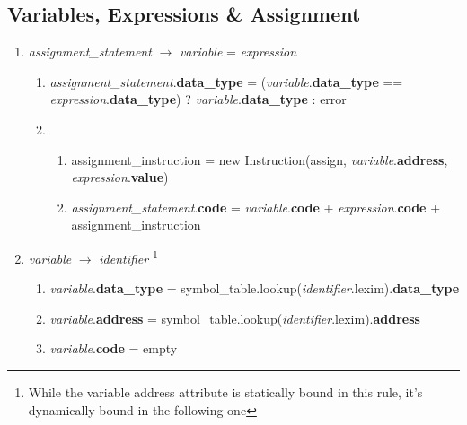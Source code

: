 \documentclass[12pt]{article}
\begin{document}
\subsection{Variables, Expressions \& Assignment}
\begin{enumerate}[label = \arabic*.]

\item \textit{ assignment\_statement } $\rightarrow$ \textit{ variable } = \textit{ expression} 
\begin{enumerate}[label = \roman*.]
\item \textit{assignment\_statement}.\textbf{data\_type} = (\textit{variable}.\textbf{data\_type} == \textit{expression}.\textbf{data\_type}) ? \textit{variable}.\textbf{data\_type} : error
\item
\begin{enumerate}[label = \alph*.]
\item assignment\_instruction = new Instruction(assign, \textit{variable}.\textbf{address}, \textit{expression}.\textbf{value})
\item \textit{assignment\_statement}.\textbf{code} = \textit{variable}.\textbf{code} + \textit{expression}.\textbf{code} + assignment\_instruction
\end{enumerate}
\end{enumerate}

\item \textit{ variable } $\rightarrow$ \textit{ identifier }\footnote{While the variable address attribute is statically bound in this rule, it's dynamically bound in the following one}
\begin{enumerate}[label = \roman*.]
\item \textit{variable}.\textbf{data\_type} = symbol\_table.lookup(\textit{identifier}.lexim).\textbf{data\_type}
\item \textit{variable}.\textbf{address} = symbol\_table.lookup(\textit{identifier}.lexim).\textbf{address}
\item \textit{variable}.\textbf{code} = empty
\end{enumerate}


\end{enumerate}
\end{document}
